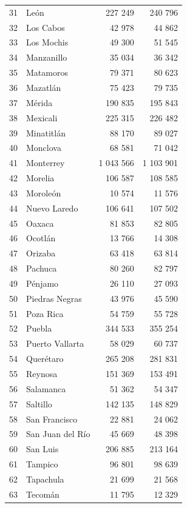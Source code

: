 \documentclass[]{article}
\begin{document}
\begin{table}[H]
\begin{tabular}{rlrr}
  31 & León & 227 249 & 240 796 \\ 
  32 & Los Cabos & 42 978 & 44 862 \\ 
  33 & Los Mochis & 49 300 & 51 545 \\ 
  34 & Manzanillo & 35 034 & 36 342 \\ 
  35 & Matamoros & 79 371 & 80 623 \\ 
  36 & Mazatlán & 75 423 & 79 735 \\ 
  37 & Mérida & 190 835 & 195 843 \\ 
  38 & Mexicali & 225 315 & 226 482 \\ 
  39 & Minatitlán & 88 170 & 89 027 \\ 
  40 & Monclova & 68 581 & 71 042 \\ 
  41 & Monterrey & 1 043 566 & 1 103 901 \\ 
  42 & Morelia & 106 587 & 108 585 \\ 
  43 & Moroleón & 10 574 & 11 576 \\ 
  44 & Nuevo Laredo & 106 641 & 107 502 \\ 
  45 & Oaxaca & 81 853 & 82 805 \\ 
  46 & Ocotlán & 13 766 & 14 308 \\ 
  47 & Orizaba & 63 418 & 63 814 \\ 
  48 & Pachuca & 80 260 & 82 797 \\ 
  49 & Pénjamo & 26 110 & 27 093 \\ 
  50 & Piedras Negras & 43 976 & 45 590 \\ 
  51 & Poza Rica & 54 759 & 55 728 \\ 
  52 & Puebla & 344 533 & 355 254 \\ 
  53 & Puerto Vallarta & 58 029 & 60 737 \\ 
  54 & Querétaro & 265 208 & 281 831 \\ 
  55 & Reynosa & 151 369 & 153 491 \\ 
  56 & Salamanca & 51 362 & 54 347 \\ 
  57 & Saltillo & 142 135 & 148 829 \\ 
  58 & San Francisco & 22 881 & 24 062 \\ 
  59 & San Juan del Río & 45 669 & 48 398 \\ 
  60 & San Luis & 206 885 & 213 164 \\ 
  61 & Tampico & 96 801 & 98 639 \\ 
  62 & Tapachula & 21 699 & 21 568 \\ 
  63 & Tecomán & 11 795 & 12 329 \\ 

\end{tabular}
\end{table}
\end{document}

